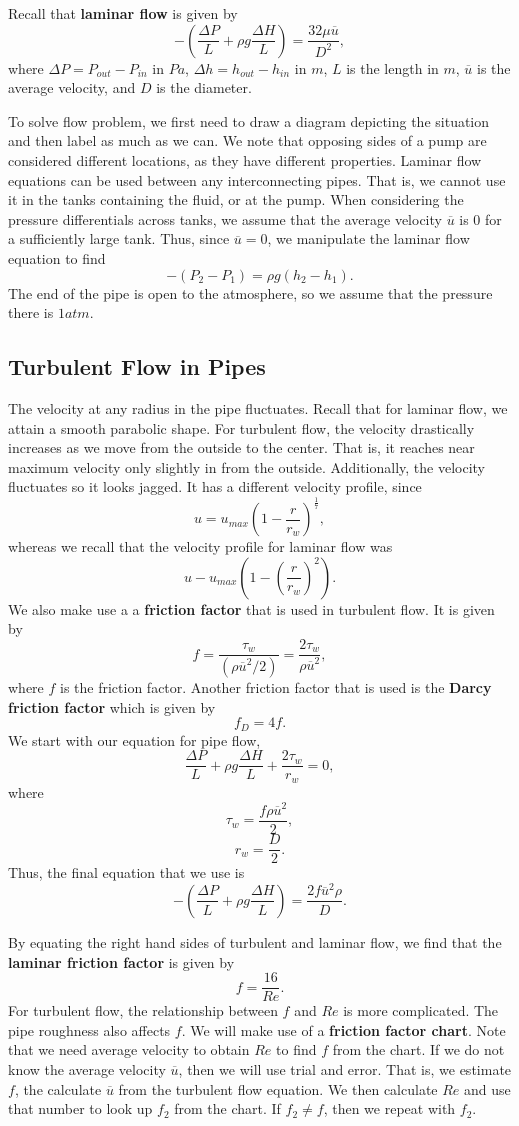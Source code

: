 \documentclass[11pt]{article}
\theoremstyle{plain} %
\theoremstyle{definition}
\theoremstyle{example}
\theoremstyle{remark}
\begin{document}
Recall that \textbf{laminar flow} is given by 
$$-\left(\frac{\Delta P}{L} + \rho g \frac{\Delta H}{L}\right) = \frac{32\mu \overline u}{D^2},$$
where $\Delta P = P_{out}-P_{in}$ in $Pa$, $\Delta h = h_{out}-h_{in}$ in $m$, $L$ is the length in $m$, $\overline u$ is the average velocity, and $D$ is the diameter. 
	
To solve flow problem, we first need to draw a diagram depicting the situation and then label as much as we can. We note that opposing sides of a pump are considered different locations, as they have different properties. Laminar flow equations can be used between any interconnecting pipes. That is, we cannot use it in the tanks containing the fluid, or at the pump. When considering the pressure differentials across tanks, we assume that the average velocity $\overline u$ is 0 for a sufficiently large tank. Thus, since $\overline u=0$, we manipulate the laminar flow equation to find 
$$-(P_2-P_1)=\rho g(h_2-h_1).$$
The end of the pipe is open to the atmosphere, so we assume that the pressure there is $1atm$. 
	
\subsection{Turbulent Flow in Pipes}
The velocity at any radius in the pipe fluctuates. Recall that for laminar flow, we attain a smooth parabolic shape. For turbulent flow, the velocity drastically increases as we move from the outside to the center. That is, it reaches near maximum velocity only slightly in from the outside. Additionally, the velocity fluctuates so it looks jagged. It has a different velocity profile, since $$u = u_{max}\left(1-\frac{r}{r_w}\right)^{\frac{1}{7}},$$
whereas we recall that the velocity profile for laminar flow was 
$$u - u_{max}\left(1-\left(\frac{r}{r_w}\right)^2\right).$$
We also make use a a \textbf{friction factor} that is used in turbulent flow. It is given by 
$$f = \frac{\tau_w}{\left(\rho\overline u^2/2\right)} = \frac{2\tau_w}{\rho \overline u^2},$$
where $f$ is the friction factor. Another friction factor that is used is the \textbf{Darcy friction factor} which is given by $$f_D = 4f.$$ We start with our equation for pipe flow, 
$$\frac{\Delta P}{L} + \rho g \frac{\Delta H}{L} + \frac{2\tau_w}{r_w} = 0,$$
where 
$$\tau_w = \frac{f\rho\overline u^2}{2},$$
$$r_w = \frac{D}{2}.$$
Thus, the final equation that we use is 
$$-\left(\frac{\Delta P}{L}+\rho g \frac{\Delta H}{L}\right) = \frac{2f\overline u^2\rho}{D}.$$

By equating the right hand sides of turbulent and laminar flow, we find that the \textbf{laminar friction factor} is given by 
$$f = \frac{16}{Re}.$$
For turbulent flow, the relationship between $f$ and $Re$ is more complicated. The pipe roughness also affects $f$. We will make use of a \textbf{friction factor chart}. Note that we need average velocity to obtain $Re$ to find $f$ from the chart. If we do not know the average velocity $\overline u$, then we will use trial and error. That is, we estimate $f$, the calculate $\overline u$ from the turbulent flow equation. We then calculate $Re$ and use that number to look up $f_2$ from the chart. If $f_2\neq f$, then we repeat with $f_2$. 
\end{document}
